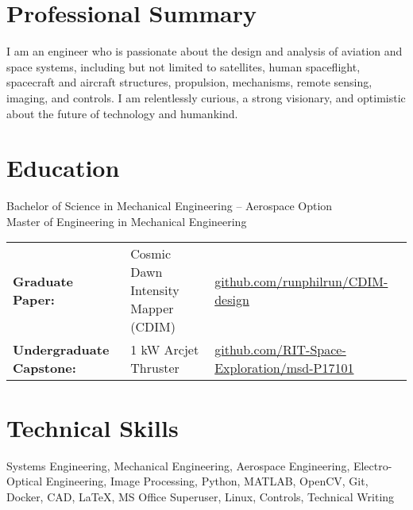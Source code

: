 \documentclass[10pt,final,sans]{resume}
\begin{document}
\setlength\headheight{28pt} %
 

\section{Professional Summary}
I am an engineer who is passionate about the design and analysis of aviation and
space systems, including but not limited to satellites, human spaceflight,
spacecraft and aircraft structures, propulsion, mechanisms, remote sensing,
imaging, and controls. I am relentlessly curious, a strong visionary, and
optimistic about the future of technology and humankind.

\section{Education}
Bachelor of Science in Mechanical Engineering -- Aerospace Option \\
Master of Engineering in Mechanical Engineering \\
\begin{tabular}{@{}lll@{}}
{\bf Graduate Paper:} & Cosmic Dawn Intensity Mapper (CDIM) &
\href{https://github.com/runphilrun/CDIM-design/blob/master/cdim_design.pdf}{github.com/runphilrun/CDIM-design} \\
{\bf Undergraduate Capstone:} & 1 kW Arcjet Thruster &
\href{https://github.com/RIT-Space-Exploration/msd-P17101/blob/master/p17101.pdf}{github.com/RIT-Space-Exploration/msd-P17101}
\end{tabular}

\section{Technical Skills}
Systems Engineering, Mechanical Engineering, Aerospace Engineering,
Electro-Optical Engineering, Image Processing, Python, MATLAB, OpenCV, Git,
Docker, CAD, {\textrm \LaTeX}, MS Office Superuser, Linux, Controls, Technical Writing
\end{document}
